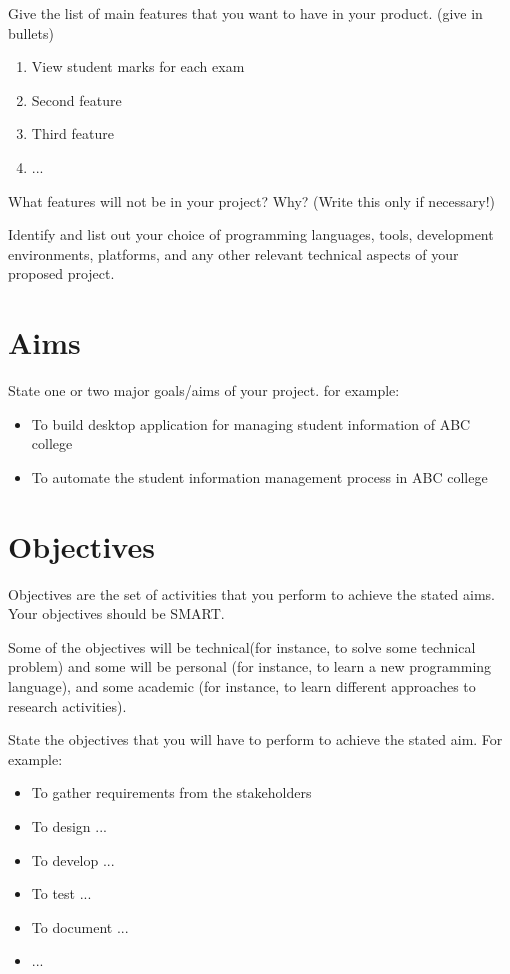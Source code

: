 \documentclass[12pt, a4paper]{report}
\begin{document}
Give the list of main features that you want to have in your product. (give in bullets)
\begin{enumerate}
  \item View student marks for each exam
  \item Second feature
  \item Third feature
  \item ...
\end{enumerate}
What features will not be in your project? Why? (Write this only if necessary!)

Identify and list out your choice of programming languages, tools, development environments, platforms, and any other relevant technical aspects of your proposed project.


\section{Aims} %
\label{sec:aims}

State one or two major goals/aims of your project.
for example:\\
\begin{itemize}
  \item To build desktop application for managing student information of ABC college
  \item To automate the student information management process in ABC college
\end{itemize}

\section{Objectives} %
\label{sec:objectives}
Objectives are the set of activities that you perform to achieve the stated aims. Your objectives should be SMART.

Some of the objectives will be technical(for instance, to solve some technical problem) and some will be personal (for instance, to learn a new programming language), and some academic (for instance, to learn different approaches to research activities).

State the objectives that you will have to perform to achieve the stated aim. For example:
\begin{itemize}
  \item To gather requirements from the stakeholders
  \item To design ...
  \item To develop ...
  \item To test ...
  \item To document ...
  \item ...
\end{itemize}
\end{document}
